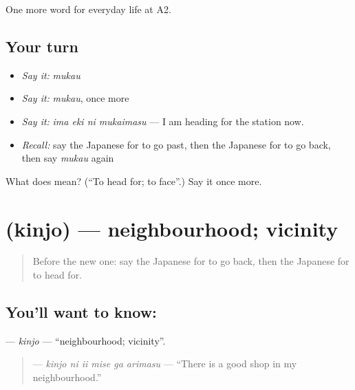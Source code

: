 \begin{grammarlens}[title={What you've built}]
One more word for everyday life at A2.
\end{grammarlens}

\subsection*{Your turn}
\begin{itemize}
\raggedright
  \item \emph{Say it:} \emph{mukau}
  \item \emph{Say it:} \emph{mukau}, once more
  \item \emph{Say it:} \emph{ima eki ni mukaimasu} — I am heading for the station now.
  \item \emph{Recall:} say the Japanese for to go past, then the Japanese for to go back, then say \emph{mukau} again
\end{itemize}

\begin{tcolorbox}[breakable,colback=teal!4,colframe=teal!35!black,title={Before you move on}]
What does  mean? (\textquotedblleft{}To head for; to face\textquotedblright{}.) Say it once more.
\end{tcolorbox}
\section[\texorpdfstring{\ja{きんじょ} (kinjo)}{きんじょ (kinjo)}]{ (kinjo) — neighbourhood; vicinity}

\label{lesson:JA-C196-kinjo}



\begin{quote}
Before the new one: say the Japanese for to go back, then the Japanese for to head for.
\end{quote}

\subsection*{You'll want to know: }
\textbf{} — \emph{kinjo} — \textquotedblleft{}neighbourhood; vicinity\textquotedblright{}.

\begin{quote}
\textbf{   } — \emph{kinjo ni ii mise ga arimasu} — \textquotedblleft{}There is a good shop in my neighbourhood.\textquotedblright{}
\end{quote}

